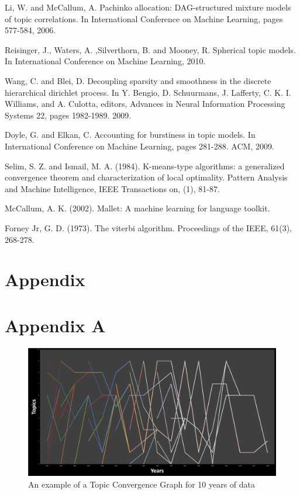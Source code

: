 \documentclass[conference]{IEEEtran}
\begin{document}
\begin{thebibliography}{1}
Li, W. and McCallum, A. Pachinko allocation: DAG-structured mixture models of topic correlations. In International Conference on Machine Learning, pages 577-584, 2006.

Reisinger, J., Waters, A. ,Silverthorn, B. and Mooney, R. Spherical topic models. In International Conference on Machine Learning, 2010.

Wang, C. and Blei, D. Decoupling sparsity and smoothness in the discrete hierarchical dirichlet process. In Y. Bengio, D. Schuurmans, J. Lafferty, C. K. I. Williams, and A. Culotta, editors, Advances in Neural Information Processing Systems 22, pages 1982-1989. 2009.

Doyle, G. and Elkan, C. Accounting for burstiness in topic models. In International Conference on Machine Learning, pages 281-288. ACM, 2009.

Selim, S. Z. and Ismail, M. A. (1984). K-means-type algorithms: a generalized convergence theorem and characterization of local optimality. Pattern Analysis and Machine Intelligence, IEEE Transactions on, (1), 81-87.


McCallum, A. K. (2002). Mallet: A machine learning for language toolkit.

Forney Jr, G. D. (1973). The viterbi algorithm. Proceedings of the IEEE, 61(3), 268-278.

\end{thebibliography}


\section{Appendix}
\section{Appendix A}
\begin{figure}[h]
	\center
	\includegraphics[width=1.3\textwidth, angle=270]{fig/tcg.png}
	\caption{An example of a Topic Convergence Graph for 10 years of data}
	\label{tcg}
\end{figure}




\end{document}
